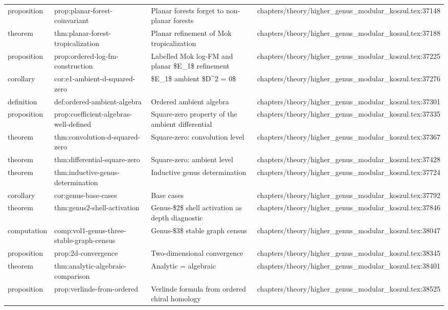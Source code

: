 \documentclass[11pt]{article}
\begin{document}
\begin{longtable}{L{0.10\textwidth}L{0.26\textwidth}L{0.42\textwidth}L{0.22\textwidth}}
proposition & prop:planar-forest-coinvariant & Planar forests forget to non-planar forests & chapters/theory/higher\_genus\_modular\_koszul.tex:37148\\
theorem & thm:planar-forest-tropicalization & Planar refinement of Mok tropicalization & chapters/theory/higher\_genus\_modular\_koszul.tex:37188\\
proposition & prop:ordered-log-fm-construction & Labelled Mok log-FM and planar \$E\_1\$ refinement & chapters/theory/higher\_genus\_modular\_koszul.tex:37225\\
corollary & cor:e1-ambient-d-squared-zero & \$E\_1\$ ambient \$D\textasciicircum{}2 = 0\$ & chapters/theory/higher\_genus\_modular\_koszul.tex:37276\\
definition & def:ordered-ambient-algebra & Ordered ambient algebra & chapters/theory/higher\_genus\_modular\_koszul.tex:37301\\
proposition & prop:coefficient-algebras-well-defined & Square-zero property of the ambient differential & chapters/theory/higher\_genus\_modular\_koszul.tex:37335\\
theorem & thm:convolution-d-squared-zero & Square-zero: convolution level & chapters/theory/higher\_genus\_modular\_koszul.tex:37367\\
theorem & thm:differential-square-zero & Square-zero: ambient level & chapters/theory/higher\_genus\_modular\_koszul.tex:37428\\
theorem & thm:inductive-genus-determination & Inductive genus determination & chapters/theory/higher\_genus\_modular\_koszul.tex:37724\\
corollary & cor:genus-base-cases & Base cases & chapters/theory/higher\_genus\_modular\_koszul.tex:37792\\
theorem & thm:genus2-shell-activation & Genus-\$2\$ shell activation as depth diagnostic & chapters/theory/higher\_genus\_modular\_koszul.tex:37846\\
computation & comp:vol1-genus-three-stable-graph-census & Genus-\$3\$ stable graph census & chapters/theory/higher\_genus\_modular\_koszul.tex:38047\\
proposition & prop:2d-convergence & Two-dimensional convergence & chapters/theory/higher\_genus\_modular\_koszul.tex:38345\\
theorem & thm:analytic-algebraic-comparison & Analytic = algebraic & chapters/theory/higher\_genus\_modular\_koszul.tex:38401\\
proposition & prop:verlinde-from-ordered & Verlinde formula from ordered chiral homology & chapters/theory/higher\_genus\_modular\_koszul.tex:38525\\

\end{longtable}
\end{document}
